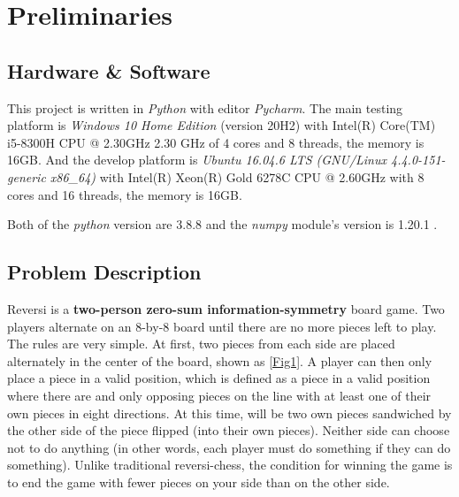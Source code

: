 \documentclass[conference,compsoc]{IEEEtran}
\begin{document}
\maketitle
\tableofcontents




%
\IEEEpeerreviewmaketitle

\section{Preliminaries}

\subsection{Hardware \& Software}
This project is written in \emph{Python} with editor \emph{Pycharm}. The main testing platform is \emph{Windows 10 Home Edition} (version 20H2) with Intel(R) Core(TM) i5-8300H CPU @ 2.30GHz 2.30 GHz of 4 cores and 8 threads, the memory is 16GB. And the develop platform is \emph{Ubuntu 16.04.6 LTS (GNU/Linux 4.4.0-151-generic x86\_64)} with Intel(R) Xeon(R) Gold 6278C CPU @ 2.60GHz with 8 cores and 16 threads, the memory is 16GB.

Both of the \emph{python} version are 3.8.8 and the \emph{numpy} module's version is 1.20.1 .

\subsection{Problem Description}
Reversi is a \textbf{two-person zero-sum information-symmetry} board game. Two players alternate on an 8-by-8 board until there are no more pieces left to play. The rules are very simple. At first, two pieces from each side are placed alternately in the center of the board, shown as \ref{Fig1}. A player can then only place a piece in a valid position, which is defined as a piece in a valid position where there are and only opposing pieces on the line with at least one of their own pieces in eight directions. At this time, will be two own pieces sandwiched by the other side of the piece flipped (into their own pieces). Neither side can choose not to do anything (in other words, each player must do something if they can do something). Unlike traditional reversi-chess, the condition for winning the game is to end the game with fewer pieces on your side than on the other side.
\end{document}
